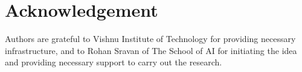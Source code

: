 \documentclass[review]{cvpr}
\begin{document}
\section{Acknowledgement}
Authors are grateful to Vishnu Institute of Technology for providing necessary infrastructure, and to Rohan Sravan of The School of AI for initiating the idea and providing necessary support to carry out the research.

{\small


}
\end{document}
